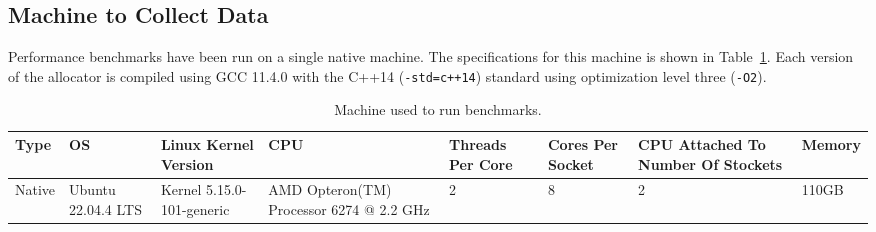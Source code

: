 


\subsection{Machine to Collect Data}

Performance benchmarks have been run on a single native machine. The specifications for this machine is shown in Table~\ref{table:machine}. Each version of the allocator is compiled using GCC 11.4.0 with the C++14 (\texttt{-std=c++14}) standard using optimization level three (\texttt{-O2}).

\begin{table}[H]
\centering
\footnotesize
\begin{tabular}{p{1cm}p{2in}p{20mm}p{1cm}p{50pt}p{2cm}p{1cm}p{1cm}p{2cm}p{15mm}}
Type   & \multicolumn{3}{p{1cm}}{OS}                 & Linux Kernel Version      & CPU                                      & Threads Per Core & Cores Per Socket & CPU Attached To Number Of Stockets & Memory \\
\hline
Native & \multicolumn{3}{p{1cm}}{Ubuntu 22.04.4 LTS} & Kernel 5.15.0-101-generic & AMD Opteron(TM) Processor 6274 @ 2.2 GHz & 2                & 8                & 2                                  & 110GB 
\end{tabular}
\caption{Machine used to run benchmarks.}
\label{table:machine}
\end{table}



